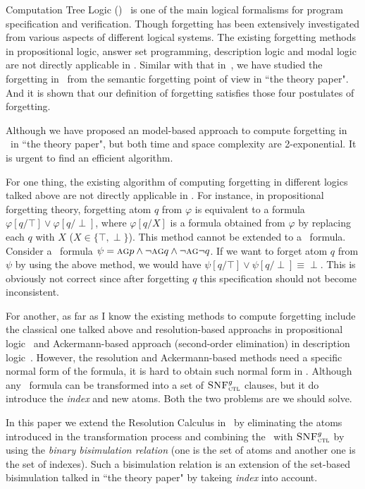 \documentclass{article}
\begin{document}
 Computation Tree Logic (\CTL)~\cite{clarke1981design} is one of the main logical formalisms for
program specification and verification.
Though forgetting has been extensively investigated from various aspects of different logical systems.
The existing forgetting methods in propositional
logic, answer set programming, description logic and modal logic are not directly applicable in \CTL.
Similar with that in~\cite{Yan:AIJ:2009}, we have studied the forgetting in \CTL\ from the semantic forgetting point of view in ``the theory paper".
And it is shown that our definition of forgetting satisfies those four postulates of forgetting.

Although we have proposed an model-based approach to compute forgetting in \CTL\ in ``the theory paper", but both time and space complexity are 2-exponential. It is urgent to find an efficient algorithm.

For one thing, the existing algorithm of computing forgetting in different logics talked above are not directly applicable in \CTL. For instance, in propositional forgetting theory, forgetting atom $q$ from $\varphi$ is equivalent to a formula $\varphi[q/\top] \vee \varphi[q/\perp]$, where $\varphi[q/X]$ is a formula obtained from $\varphi$ by replacing each $q$ with $X$ ($X\in \{\top, \perp\}$).
This method cannot be extended to a \CTL\ formula. Consider a \CTL\ formula $\psi=\textsc{a}\textsc{g} p \wedge \neg \textsc{a}\textsc{g} q \wedge \neg \textsc{a}\textsc{g} \neg q$. If we want to forget
atom $q$ from $\psi$ by using the above method, we would have $\psi[q/\top] \vee \psi[q/\perp] \equiv \perp$. This is obviously not correct since after forgetting $q$ this specification should
not become inconsistent.

For another, as far as I know the existing methods to compute forgetting include the classical one talked above and resolution-based approachs in propositional logic~\cite{lin1994forget,Yisong:2015:arx} and Ackermann-based approach (second-order elimination) in description logic~\cite{Zhao:2017:IJCAI}. However, the resolution and Ackermann-based methods need a specific normal form of the formula, it is hard to obtain such normal form in \CTL.
Although any \CTL\ formula can be transformed into a set of ${\textsc{SNF}_{\textsc{ctl}}^g}$ clauses, but it do introduce the \emph{index} and new atoms. Both the two problems are we should solve.

In this paper we extend the Resolution Calculus in~\cite{zhang2014resolution} by eliminating the atoms introduced in the transformation process and combining the \CTL\ with ${\textsc{SNF}_{\textsc{ctl}}^g}$ by using the \emph{binary bisimulation relation} (one is the set of atoms and another one is the set of indexes).
Such a bisimulation relation is an extension of the set-based bisimulation talked in ``the theory paper" by takeing \emph{index} into account.
\end{document}
